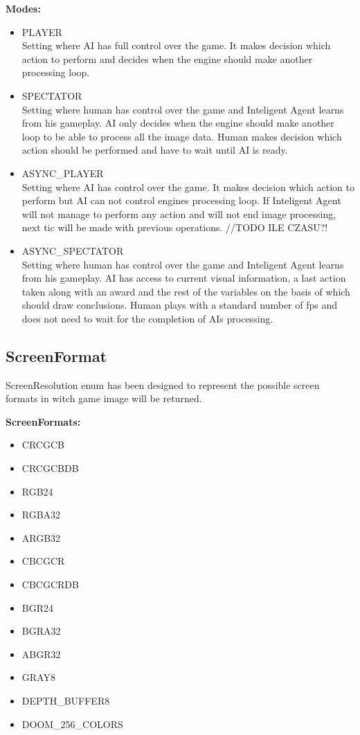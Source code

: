 \vspace{20pt}
\textbf{Modes:}
\begin{itemize}
\item PLAYER \\
Setting where AI has full control over the game. It makes decision which action to perform and decides when the engine should make another processing loop.
\item SPECTATOR \\
Setting where human has control over the game and Inteligent Agent learns from his gameplay. AI only decides when the engine should make another loop to be able to process all the image data. Human makes decision which action should be performed and have to wait until AI is ready. 
\item ASYNC\_PLAYER \\ 
Setting where AI has control over the game. It makes decision which action to perform but AI can not control engines processing loop. If Inteligent Agent will not manage to perform any action and will not end image processing, next tic will be made with previous operations.
//TODO ILE CZASU?!
\item ASYNC\_SPECTATOR \\
Setting where human has control over the game and Inteligent Agent learns from his gameplay. AI has access to current visual information, a last action taken along with an award and the rest of the variables on the basis of which should draw conclusions. Human plays with a standard number of fps and does not need to wait for the completion of AIs processing.
\end{itemize}

\subsection{ScreenFormat}\label{subsec:screenformat}
ScreenResolution enum has been designed to represent the possible screen formats in witch game image will be returned. 


\vspace{20pt}
\textbf{ScreenFormats:}
\begin{itemize}
 \item CRCGCB 
 \item CRCGCBDB
 \item RGB24
 \item RGBA32
 \item ARGB32
 \item CBCGCR
 \item CBCGCRDB
 \item BGR24
 \item BGRA32
 \item ABGR32
 \item GRAY8
 \item DEPTH_BUFFER8
 \item DOOM\_256\_COLORS
\end{itemize}
